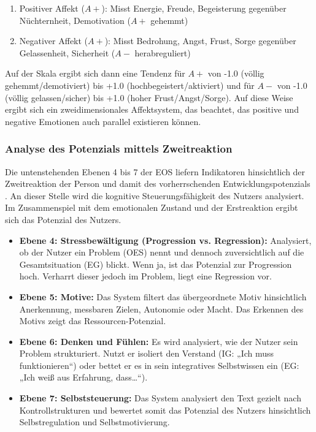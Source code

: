 \begin{enumerate}
    \item Positiver Affekt (\(A+\)): Misst Energie, Freude, Begeisterung gegenüber Nüchternheit, Demotivation (\(A+\) gehemmt)
    \item Negativer Affekt (\(A+\)): Misst Bedrohung, Angst, Frust, Sorge gegenüber Gelassenheit, Sicherheit (\(A-\) herabreguliert) 
\end{enumerate}

Auf der Skala ergibt sich dann eine Tendenz für \(A+\) von -1.0 (völlig gehemmt/demotiviert) bis +1.0 (hochbegeistert/aktiviert) und für \(A-\) von -1.0 (völlig gelassen/sicher) bis +1.0 (hoher Frust/Angst/Sorge). Auf diese Weise ergibt sich ein zweidimensionales Affektsystem, das beachtet, das positive und negative Emotionen auch parallel existieren können.

\subsubsection{Analyse des Potenzials mittels Zweitreaktion}
Die untenstehenden Ebenen 4 bis 7 der EOS liefern Indikatoren hinsichtlich der Zweitreaktion der Person und damit des vorherrschenden Entwicklungspotenzials \citep{kuhl2004systemdiagnostik}. An dieser Stelle wird die kognitive Steuerungsfähigkeit des Nutzers analysiert. Im Zusammenspiel mit dem emotionalen Zustand und der Erstreaktion ergibt sich das Potenzial des Nutzers.

\begin{itemize}
    \item \textbf{Ebene 4: Stressbewältigung (Progression vs. Regression):} Analysiert, ob der Nutzer ein Problem (OES) nennt und dennoch zuversichtlich auf die Gesamtsituation (EG) blickt. Wenn ja, ist das Potenzial zur Progression hoch. Verharrt dieser jedoch im Problem, liegt eine Regression vor.
    \item \textbf{Ebene 5: Motive:} Das System filtert das übergeordnete Motiv hinsichtlich Anerkennung, messbaren Zielen, Autonomie oder Macht. Das Erkennen des Motivs zeigt das Ressourcen-Potenzial.
    \item \textbf{Ebene 6: Denken und Fühlen:} Es wird analysiert, wie der Nutzer sein Problem strukturiert. Nutzt er isoliert den Verstand (IG: „Ich muss funktionieren“) oder bettet er es in sein integratives Selbstwissen ein (EG: „Ich weiß aus Erfahrung, dass…“).
    \item \textbf{Ebene 7: Selbststeuerung:} Das System analysiert den Text gezielt nach Kontrollstrukturen und bewertet somit das Potenzial des Nutzers hinsichtlich Selbstregulation und Selbstmotivierung.
\end{itemize}

